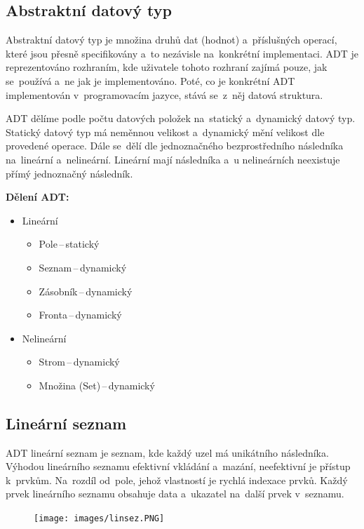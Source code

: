 \subsection{Abstraktní datový typ}

Abstraktní datový typ je množina druhů dat (hodnot) a~příslušných operací, které jsou přesně specifikovány a~to nezávisle na~konkrétní implementaci. ADT je reprezentováno rozhraním, kde uživatele tohoto rozhraní zajímá pouze, jak se~používá a~ne jak je implementováno. Poté, co je konkrétní ADT implementován v~programovacím jazyce, stává se~z~něj datová struktura.

ADT dělíme podle počtu datových položek na~statický a~dynamický datový typ. Statický datový typ má neměnnou velikost a~dynamický mění velikost dle provedené operace. Dále se~dělí dle jednoznačného bezprostředního následníka na~lineární a~nelineární. Lineární mají následníka a~u nelineárních neexistuje přímý jednoznačný následník.

\textbf{Dělení ADT:}
\begin{itemize}[noitemsep]
	\item Lineární
	\begin{itemize}[noitemsep]
		 \item Pole\,--\,statický
		 \item Seznam\,--\,dynamický
		 \item Zásobník\,--\,dynamický
		 \item Fronta\,--\,dynamický
	\end{itemize}
	\item Nelineární
	\begin{itemize}[noitemsep]
		 \item Strom\,--\,dynamický
		 \item Množina (Set)\,--\,dynamický
	\end{itemize}
\end{itemize}

\subsection{Lineární seznam}

ADT lineární seznam je seznam, kde každý uzel má unikátního následníka. Výhodou lineárního seznamu efektivní vkládání a~mazání, neefektivní je přístup k~prvkům. Na~rozdíl od~pole, jehož vlastností je rychlá indexace prvků. Každý prvek lineárního seznamu obsahuje data a~ukazatel na~další prvek v~seznamu.

\begin{figure}[ht]
	\centering
	\texttt{[image: images/linsez.PNG]}
\end{figure}

